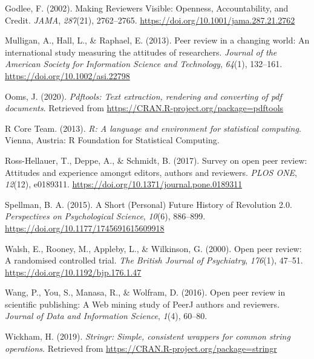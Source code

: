 \documentclass[
  english,
  ,jou, a4paper,floatsintext]{apa6}
\begin{document}
\leavevmode\hypertarget{ref-godlee_making_2002}{}%
Godlee, F. (2002). Making Reviewers Visible: Openness, Accountability, and Credit. \emph{JAMA}, \emph{287}(21), 2762--2765. \url{https://doi.org/10.1001/jama.287.21.2762}

\leavevmode\hypertarget{ref-mulligan_peer_2013}{}%
Mulligan, A., Hall, L., \& Raphael, E. (2013). Peer review in a changing world: An international study measuring the attitudes of researchers. \emph{Journal of the American Society for Information Science and Technology}, \emph{64}(1), 132--161. \url{https://doi.org/10.1002/asi.22798}

\leavevmode\hypertarget{ref-ooms_pdftools_2019}{}%
Ooms, J. (2020). \emph{Pdftools: Text extraction, rendering and converting of pdf documents}. Retrieved from \url{https://CRAN.R-project.org/package=pdftools}

\leavevmode\hypertarget{ref-r_core_team_r_2013}{}%
R Core Team. (2013). \emph{R: A language and environment for statistical computing}. Vienna, Austria: R Foundation for Statistical Computing.

\leavevmode\hypertarget{ref-ross-hellauer_survey_2017}{}%
Ross-Hellauer, T., Deppe, A., \& Schmidt, B. (2017). Survey on open peer review: Attitudes and experience amongst editors, authors and reviewers. \emph{PLOS ONE}, \emph{12}(12), e0189311. \url{https://doi.org/10.1371/journal.pone.0189311}

\leavevmode\hypertarget{ref-spellman_short_2015}{}%
Spellman, B. A. (2015). A Short (Personal) Future History of Revolution 2.0. \emph{Perspectives on Psychological Science}, \emph{10}(6), 886--899. \url{https://doi.org/10.1177/1745691615609918}

\leavevmode\hypertarget{ref-walsh_open_2000}{}%
Walsh, E., Rooney, M., Appleby, L., \& Wilkinson, G. (2000). Open peer review: A randomised controlled trial. \emph{The British Journal of Psychiatry}, \emph{176}(1), 47--51. \url{https://doi.org/10.1192/bjp.176.1.47}

\leavevmode\hypertarget{ref-wang_open_2016}{}%
Wang, P., You, S., Manasa, R., \& Wolfram, D. (2016). Open peer review in scientific publishing: A Web mining study of PeerJ authors and reviewers. \emph{Journal of Data and Information Science}, \emph{1}(4), 60--80.

\leavevmode\hypertarget{ref-wickham_stringr_2019}{}%
Wickham, H. (2019). \emph{Stringr: Simple, consistent wrappers for common string operations}. Retrieved from \url{https://CRAN.R-project.org/package=stringr}
\end{document}
